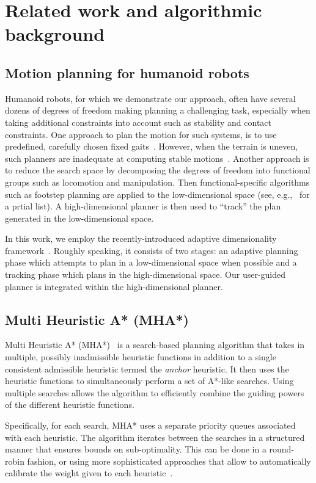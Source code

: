 \documentclass[conference]{IEEEtran}
\begin{document}
\section{Related work and algorithmic background}
\subsection{Motion planning for humanoid robots}
\label{sec:rel}
Humanoid robots, for which we demonstrate our approach, often have several dozens of degrees of freedom making planning a challenging task, especially when taking additional constraints into account such as stability and contact constraints.
One approach to plan the motion for such systems, is to use predefined, carefully chosen fixed gaits~\cite{KKKHKHAI04}. 
However, when the terrain is uneven, such planners are inadequate at computing stable motions~\cite{HBLHW08}.
Another approach is to reduce the search space by decomposing the degrees of freedom into functional groups such as locomotion and manipulation.
Then functional-specific algorithms such as footstep planning are applied to the low-dimensional space (see, e.g.,~\cite{CLCKHK05, KNKII01, PSBLY12, XCXZC09, KKNII02} for a prtial list).
A high-dimensional planner is then used to ``track'' the plan generated in the low-dimensional space.

In this work, we employ the recently-introduced adaptive dimensionality framework~\cite{GCBSL11, GSL12, GSL13}.
Roughly speaking,  it consists of two stages: an adaptive planning phase which attempts to plan in a low-dimensional space when possible and a tracking phase which plans in the high-dimensional space.
Our user-guided planner is integrated within the high-dimensional planner.

\subsection{Multi Heuristic A* (MHA*)}
\label{sec:mha}
Multi Heuristic A* (MHA*)~\cite{ASNHL16, NAL15} is a search-based planning algorithm that takes in multiple, possibly inadmissible heuristic functions in addition to a single consistent admissible heuristic termed the \emph{anchor} heuristic.
It then uses the heuristic functions to simultaneously perform a set of A*-like searches.
Using multiple searches allows the algorithm to efficiently combine the guiding powers of the different heuristic functions. 

Specifically, for each search, MHA* uses a separate priority queues associated with each heuristic. 
The algorithm iterates between the searches in a structured manner that ensures bounds on sub-optimality. 
This can be done in a round-robin fashion, or using more 
sophisticated approaches that allow to automatically calibrate the weight given to each heuristic~\cite{PNAL15}.
\end{document}
